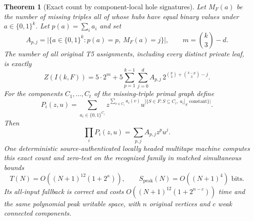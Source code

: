 \documentclass[11pt]{article}
\newtheorem{theorem}{Theorem}
\begin{document}
\begin{theorem}[Exact count by component-local hole signatures]
Let $M_F(a)$ be the number of missing triples all of
whose hubs have equal binary values under
$a\in\{0,1\}^k$. Let $p(a)=\sum_i a_i$ and set
\[
 A_{p,j}=
 \bigl|\{a\in\{0,1\}^k:
 p(a)=p,\ M_F(a)=j\}\bigr|,
 \qquad m=\binom k3-d.
\]
The number of \emph{all original T5 assignments}, including
every distinct private leaf, is exactly
\[
\boxed{\displaystyle
 Z(I(k,F))=
 5\cdot 2^m+
 5\sum_{p=1}^{k-1}\sum_{j=0}^{d}
 A_{p,j}\,2^{\binom p3+\binom{k-p}3-j}.}
\]
For the components $C_1,\ldots,C_t$ of the missing-triple
primal graph define
\[
 P_i(z,u)=\sum_{a_i\in\{0,1\}^{C_i}}
 z^{\sum_{v\in C_i}a_i(v)}
 u^{|\{S\in F:S\subseteq C_i,\ a_i|_S\text{ constant}\}|}.
\]
Then
\[
 \prod_i P_i(z,u)=\sum_{p,j}A_{p,j}z^pu^j.
\]
One deterministic source-authenticated locally headed
multitape machine computes this exact count and zero-test
on the recognized family in matched simultaneous bounds
\[
\boxed{\displaystyle
 T(N)=O((N+1)^{12}(1+2^\kappa)),\qquad
 S_{\mathrm{peak}}(N)=O((N+1)^4)\text{ bits}.}
\]
Its all-input fallback is correct and costs
$O((N+1)^{12}(1+2^{n-c}))$ time and the same polynomial
peak writable space, with $n$ original vertices and $c$
weak connected components.
\end{theorem}
\end{document}
